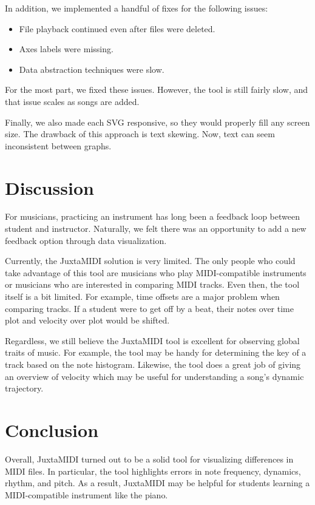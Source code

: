 \documentclass[journal]{vgtc}                %
\begin{document}
In addition, we implemented a handful of fixes for the following issues:

\begin{itemize}
  \item File playback continued even after files were deleted.
  \item Axes labels were missing.
  \item Data abstraction techniques were slow.
\end{itemize}

For the most part, we fixed these issues. However, the tool is still fairly
slow, and that issue scales as songs are added.

Finally, we also made each SVG responsive, so they would properly fill
any screen size. The drawback of this approach is text skewing. Now, text can
seem inconsistent between graphs.

\section{Discussion}

For musicians, practicing an instrument has long been a feedback loop between
student and instructor. Naturally, we felt there was an opportunity to add
a new feedback option through data visualization.

Currently, the JuxtaMIDI solution is very limited. The only people who
could take advantage of this tool are musicians who play MIDI-compatible
instruments or musicians who are interested in comparing MIDI tracks.
Even then, the tool itself is a bit limited. For example, time offsets
are a major problem when comparing tracks. If a student were to get off by
a beat, their notes over time plot and velocity over plot would be shifted.

Regardless, we still believe the JuxtaMIDI tool is excellent for observing
global traits of music. For example, the tool may be handy for determining
the key of a track based on the note histogram. Likewise, the tool does a
great job of giving an overview of velocity which may be useful for understanding
a song's dynamic trajectory.

\section{Conclusion}

Overall, JuxtaMIDI turned out to be a solid tool for visualizing differences
in MIDI files. In particular, the tool highlights errors in note frequency,
dynamics, rhythm, and pitch. As a result, JuxtaMIDI may be helpful for
students learning a MIDI-compatible instrument like the piano.
\end{document}
